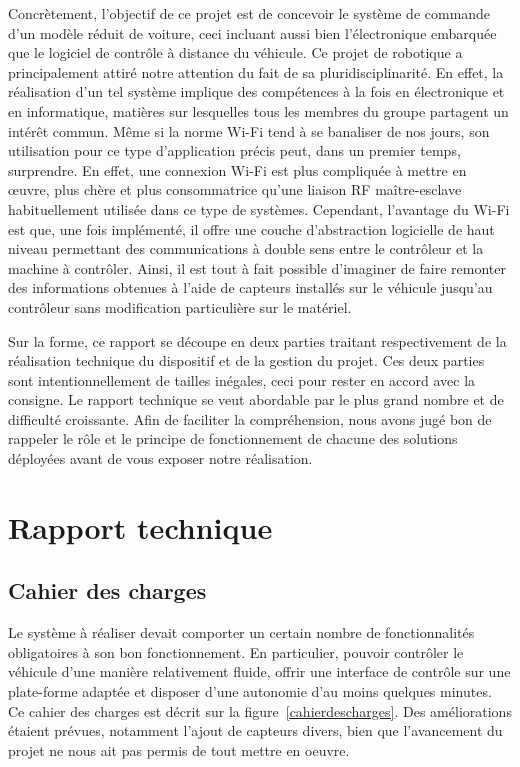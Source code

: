 \documentclass[a4paper,12pt]{report}
\begin{document}
Concrètement, l’objectif de ce projet est de concevoir le système de commande d’un modèle réduit de voiture, ceci incluant aussi bien l’électronique embarquée que le logiciel de contrôle à distance du véhicule. Ce projet de robotique a principalement attiré notre attention du fait de sa pluridisciplinarité. En effet, la réalisation d’un tel système implique des compétences à la fois en électronique et en informatique, matières sur lesquelles tous les membres du groupe partagent un intérêt commun. Même si  la norme Wi-Fi tend à se banaliser de nos jours, son utilisation pour ce type d’application précis peut, dans un premier temps, surprendre. En effet, une connexion Wi-Fi est plus compliquée à mettre en œuvre, plus chère et plus consommatrice qu’une liaison RF maître-esclave habituellement utilisée dans ce type de systèmes. Cependant, l’avantage du Wi-Fi est que, une fois implémenté, il offre une couche d’abstraction logicielle de haut niveau permettant des communications à double sens entre le contrôleur et la machine à contrôler. Ainsi, il est tout à fait possible d’imaginer de faire remonter des informations obtenues à l’aide de capteurs installés sur le véhicule jusqu’au contrôleur sans modification particulière sur le matériel.

Sur la forme, ce rapport se découpe en deux parties traitant respectivement de la réalisation technique du dispositif et de la gestion du projet. Ces deux parties sont intentionnellement de tailles inégales, ceci pour rester en accord avec la consigne. Le rapport technique se veut abordable par le plus grand nombre et de difficulté croissante. Afin de faciliter la compréhension, nous avons jugé bon de rappeler le rôle et le principe de fonctionnement de chacune des solutions déployées avant de vous exposer notre réalisation. 

\tableofcontents

\chapter{Rapport technique}

	\section{Cahier des charges}
	Le système à réaliser devait comporter un certain nombre de fonctionnalités obligatoires à son bon fonctionnement. En particulier, pouvoir contrôler le véhicule d’une manière relativement fluide, offrir une interface de contrôle sur une plate-forme adaptée et disposer d’une autonomie d’au moins quelques minutes. Ce cahier des charges est décrit sur la figure~\ref{cahierdescharges}. Des améliorations étaient prévues, notamment l’ajout de capteurs divers, bien que l’avancement du projet ne nous ait pas permis de tout mettre en oeuvre.
	
\end{document}
